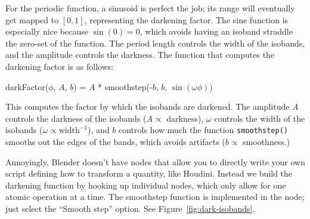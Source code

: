 \documentclass[10pt]{article}
\newcommand{\obj}[1]{\menu{\color{magenta} #1}}
\begin{document}
For the periodic function, a sinusoid is perfect the job; its range will eventually get mapped to $[0,1]$, representing the darkening factor. The sine function is especially nice because $\sin(0)=0$, which avoids having an isoband straddle the zero-set of the function. The period length controls the width of the isobands, and the amplitude controls the darkness. The function that computes the darkening factor is as follows:
\begin{center}
darkFactor($\phi$, $A$, $b$) = $A$ * smoothstep(-$b$, $b$, $\sin(\omega\phi)$)
\end{center}
This computes the factor by which the isobands are darkened. The amplitude $A$ controls the darkness of the isobands ($A\propto$ darkness), $\omega$ controls the width of the isobands ($\omega\propto \text{width}^{-1}$), and $b$ controls how much the function {\tt smoothstep()} smooths out the edges of the bands, which avoids artifacts ($b\propto$ smoothness.) 

Annoyingly, Blender doesn't have nodes that allow you to directly write your own script defining how to transform a quantity, like Houdini. Instead we build the darkening function by hooking up individual \obj{Math} nodes, which only allow for one atomic operation at a time. The smoothstep function is implemented in the \obj{Map Range} node; just select the ``Smooth step'' option. See Figure~\ref{fig:dark-isobands}.
\end{document}
